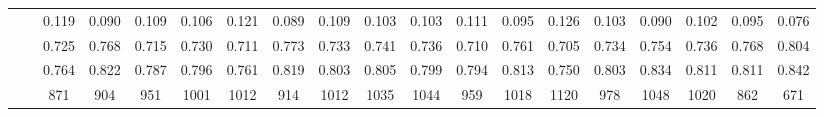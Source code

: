 \documentclass[10pt,twocolumn,letterpaper]{article}
\begin{document}
\begin{table*}[thbp]
\begin{tabular}{c|r|cccccc|cc|ccc|ccccc|c}
        &  &0.119 & 0.090 & 0.109 & 0.106 & 0.121 & 0.089 & 0.109 & 0.103 & 0.103 & 0.111 & 0.095 & 0.126 & 0.103 & 0.090 & 0.102 & 0.095 & 0.076 \\
        &  &0.725 & 0.768 & 0.715 & 0.730 & 0.711 & 0.773 & 0.733 & 0.741 & 0.736 & 0.710 & 0.761 & 0.705 & 0.734 & 0.754 & 0.736 & 0.768 & 0.804 \\
        &  &0.764 & 0.822 & 0.787 & 0.796 & 0.761 & 0.819 & 0.803 & 0.805 & 0.799 & 0.794 & 0.813 & 0.750 & 0.803 & 0.834 & 0.811 & 0.811 & 0.842 \\
        &  &871 & 904 & 951 & 1001 & 1012 & 914 & 1012 & 1035 & 1044 & 959 & 1018 & 1120 & 978 & 1048 & 1020 & 862 & 671 \\
        \hline
	\end{tabular}
\end{table*}
\end{document}
